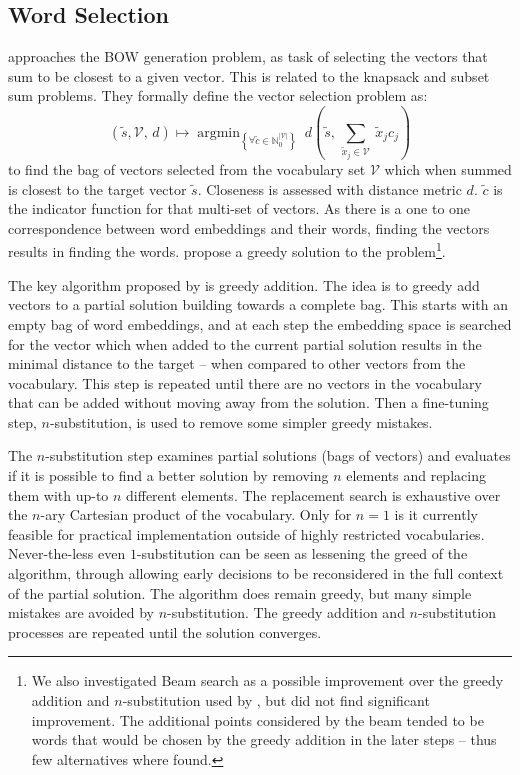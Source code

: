 \documentclass[compsoc]{IEEEtran}
\theoremstyle{plain}
\theoremstyle{definition}
\DeclareMathOperator*{\argmin}{argmin}
\begin{document}
\subsection{Word Selection} \label{selection}
\renewcommand{\c}{\tilde{c}}
\newcommand{\s}{\tilde{s}}
\newcommand{\x}{\tilde{x}}
\renewcommand{\t}{\tilde{t}}
\newcommand{\N}{\mathbb{N}}
\newcommand{\R}{\mathbb{R}}
\newcommand{\V}{\mathcal{V}}
\def\B{\mathcal{B}}




\textcite{White2015BOWgen} approaches the BOW generation problem, as task of selecting the vectors that sum to be closest to a given vector. This is related to the knapsack and subset sum problems. They formally define the vector selection problem as:
\[
(\s,\V,\,d) \mapsto \argmin_{\left\{ \forall\c\in\N_{0}^{|\V|}\right\} }\:d( \s,\,\sum_{\x_j\in\V}\:\x_{j}c_{j})
\]
to find the bag of vectors selected from the vocabulary set $\V$ which when summed is closest to the target vector $\s$. Closeness is assessed with distance metric $d$. $\c$ is the indicator function for that multi-set of vectors. As there is a one to one correspondence between word embeddings and their words, finding the vectors results in finding the words. \textcite{White2015BOWgen} propose a greedy solution to the problem\footnote{We also investigated Beam search as a possible improvement over the  greedy addition and $n$-substitution  used by \textcite{White2015BOWgen}, but did not find significant improvement. The additional points considered by the beam tended to be words that would be chosen by the greedy addition in the later steps -- thus few alternatives where found.}.

The key algorithm  proposed by \textcite{White2015BOWgen} is greedy addition. The idea is to greedy add vectors to a partial solution building towards a complete bag. This starts with an empty bag of word embeddings, and at each step the embedding space is searched for the vector which when added to the current partial solution results in the minimal distance to the target -- when compared to other vectors from the vocabulary. This step is repeated until there are no vectors in the vocabulary that can be added without moving away from the solution. Then a fine-tuning step, $n$-substitution, is used to remove some simpler greedy mistakes.

The $n$-substitution step examines partial solutions (bags of vectors) and evaluates if it is possible to find a better solution by removing $n$ elements and replacing them with up-to $n$ different elements. The replacement search is exhaustive over the $n$-ary Cartesian product of the vocabulary. Only for $n=1$ is it currently feasible for practical implementation outside of highly restricted vocabularies. Never-the-less even $1$-substitution can be seen as lessening the greed of the algorithm, through allowing early decisions to be reconsidered in the full context of the partial solution. The algorithm does remain greedy, but many simple mistakes are avoided by $n$-substitution. The greedy addition and $n$-substitution processes are repeated until the solution converges.
\end{document}
